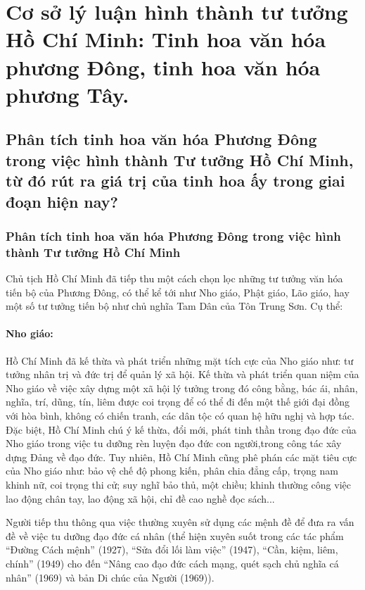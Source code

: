 \section{Cơ sở lý luận hình thành tư tưởng Hồ Chí Minh: Tinh hoa văn hóa phương Đông, tinh hoa văn hóa phương Tây.}

\subsection{Phân tích tinh hoa văn hóa Phương Đông trong việc hình thành Tư tưởng Hồ Chí Minh, từ đó rút ra giá trị của tinh hoa ấy trong giai đoạn hiện nay?}

\subsubsection{Phân tích tinh hoa văn hóa Phương Đông trong việc hình thành Tư tưởng Hồ Chí Minh}
Chủ tịch Hồ Chí Minh đã tiếp thu một cách chọn lọc những tư tưởng văn hóa tiến bộ của Phương Đông, có thể kể tới như Nho giáo, Phật giáo, Lão giáo, hay một số tư tưởng tiến bộ như chủ nghĩa Tam Dân của Tôn Trung Sơn. Cụ thể:

\paragraph{Nho giáo:}
Hồ Chí Minh đã kế thừa và phát triển những mặt tích cực của Nho giáo như: tư tưởng nhân trị và đức trị để quản lý xã hội. Kế thừa và phát triển quan niệm của Nho giáo về việc xây dựng một xã hội lý tưởng trong đó công bằng, bác ái, nhân, nghĩa, trí, dũng, tín, liêm được coi trọng để có thể đi đến một thế giới đại đồng với hòa bình, không có chiến tranh, các dân tộc có quan hệ hữu nghị và hợp tác. Đặc biệt, Hồ Chí Minh chú ý kế thừa, đổi mới, phát tinh thần trong đạo đức của Nho giáo trong việc tu dưỡng rèn luyện đạo đức con người,trong công tác xây dựng Đảng về đạo đức. Tuy nhiên, Hồ Chí Minh cũng phê phán các mặt tiêu cực của Nho giáo như: bảo vệ chế độ phong kiến, phân chia đẳng cấp, trọng nam khinh nữ, coi trọng thi cử; suy nghĩ bảo thủ, một chiều; khinh thường công việc lao động chân tay, lao động xã hội, chỉ đề cao nghề đọc
sách...

Người tiếp thu thông qua việc thường xuyên sử dụng các mệnh đề để đưa ra vấn đề về việc tu dưỡng đạo đức cá nhân (thể hiện xuyên suốt trong các tác phẩm ``Đường Cách mệnh'' (1927), ``Sửa đổi lối làm việc'' (1947), ``Cần, kiệm, liêm, chính'' (1949) cho đến ``Nâng cao đạo đức cách mạng, quét sạch chủ nghĩa cá nhân'' (1969) và bản Di chúc của Người
(1969)).

